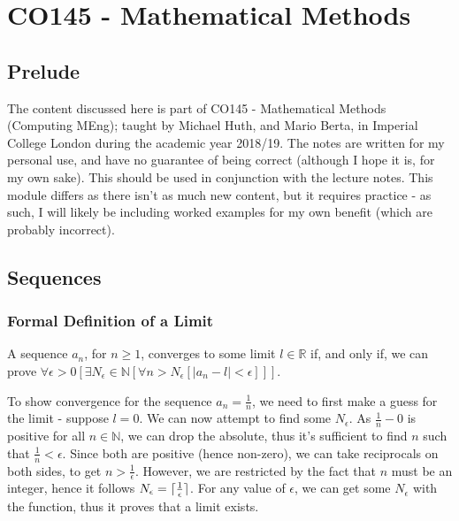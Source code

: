 \documentclass[a4paper, 12pt]{article}
\DeclarePairedDelimiter{\ceil}{\lceil}{\rceil}
\begin{document}
    \section*{CO145 - Mathematical Methods}
        \subsection*{Prelude}
            The content discussed here is part of CO145 - Mathematical Methods (Computing MEng); taught by Michael Huth, and Mario Berta, in Imperial College London during the academic year 2018/19. The notes are written for my personal use, and have no guarantee of being correct (although I hope it is, for my own sake). This should be used in conjunction with the lecture notes. This module differs as there isn't as much new content, but it requires practice - as such, I will likely be including worked examples for my own benefit (which are probably incorrect).
        \subsection*{Sequences}
            \subsubsection*{Formal Definition of a Limit}
                A sequence $a_n$, for $n \geq 1$, converges to some limit $l \in \mathbb{R}$ if, and only if, we can prove $\forall \epsilon > 0 [\exists N_\epsilon \in \mathbb{N} [\forall n > N_\epsilon [|a_n - l| < \epsilon]]]$.
                \medskip

                To show convergence for the sequence $a_n = \frac{1}{n}$, we need to first make a guess for the limit - suppose $l = 0$. We can now attempt to find some $N_\epsilon$. As $\frac{1}{n} - 0$ is positive for all $n \in \mathbb{N}$, we can drop the absolute, thus it's sufficient to find $n$ such that $\frac{1}{n} < \epsilon$. Since both are positive (hence non-zero), we can take reciprocals on both sides, to get $n > \frac{1}{\epsilon}$. However, we are restricted by the fact that $n$ must be an integer, hence it follows $N_\epsilon = \ceil{\frac{1}{\epsilon}}$. For any value of $\epsilon$, we can get some $N_\epsilon$ with the function, thus it proves that a limit exists.
\end{document}
